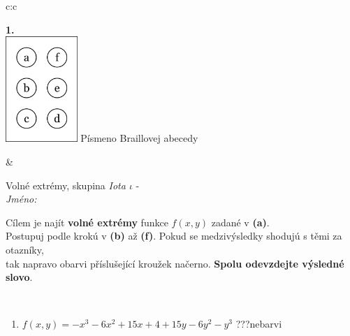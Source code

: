 \documentclass[10pt]{report}
\begin{document}
\begin{tabular}{c:c}
\begin{minipage}[c][104.5mm][t]{0.5\linewidth}
\begin{center}
\begin{minipage}{0.79\linewidth}
\begin{center}
\begin{varwidth}{\linewidth}
\begin{enumerate}
\end{enumerate}
\end{varwidth}
\end{center}
\end{minipage}
\begin{minipage}{0.20\linewidth}
\begin{center}
{\Huge\bfseries 1.} \\[2mm]
\includegraphics[height=40mm]{../images/braille.png}
{\small Písmeno Braillovej abecedy}
\end{center}
\end{minipage}
\end{center}
\end{minipage}
&
\begin{minipage}[c][104.5mm][t]{0.5\linewidth}
\begin{center}
\vspace{7mm}
{\huge Volné extrémy, skupina \textit{Iota $\iota$} -}\\[5mm]
\textit{Jméno:}\phantom{xxxxxxxxxxxxxxxxxxxxxxxxxxxxxxxxxxxxxxxxxxxxxxxxxxxxxxxxxxxxxxxxx}\\[5mm]
\begin{minipage}{0.95\linewidth}
\begin{center}
Cílem je najít \textbf{volné extrémy} funkce $f(x,y)$ zadané v \textbf{(a)}.\\Postupuj podle krokú v \textbf{(b)} až \textbf{(f)}. Pokud se medzivýsledky shodujú s těmi za otazníky,\\tak napravo obarvi příslušející kroužek načerno. \textbf{Spolu odevzdejte výsledné slovo}.
\end{center}
\end{minipage}
\\[1mm]
\begin{minipage}{0.79\linewidth}
\begin{center}
\begin{varwidth}{\linewidth}
\begin{enumerate}
\normalsize
\item $f(x,y)=-x^3-6x^2+15x+4+15y-6y^2-y^3$\quad \dotfill\; ???\;\dotfill \quad nebarvi

\end{enumerate}
\end{varwidth}
\end{center}
\end{minipage}
\end{center}
\end{minipage}
\end{tabular}
\end{document}
